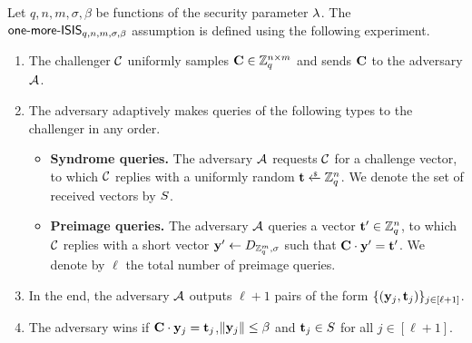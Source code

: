 \begin{definition}
    \label{def:omsis}
    Let $q,n,m,\sigma,\beta$ be functions of the security parameter $\lambda$.
    The $\mathsf{one}\text{-}\mathsf{more}\text{-}\mathsf{ISIS}_{q,n,m,\sigma,\beta}$ assumption is defined using the following
    experiment.
    \begin{enumerate}
        \item The challenger $\mathcal{C}$ uniformly samples $\mathbf{C}\in\mathbb{Z}_q^{n\times m}$ and sends $\mathbf{C}$ to the adversary $\mathcal{A}$.
        \item The adversary adaptively makes queries of the following types to the
        challenger in any order.
        \begin{itemize}
            \item \textbf{Syndrome queries.} The adversary $\mathcal{A}$ requests $\mathcal{C}$ for a challenge vector, to which $\mathcal{C}$ replies with
            a uniformly random $\vect\getsr\Zq^n$. We denote the set of received vectors by $S$.
            \item \textbf{Preimage queries.} The adversary $\mathcal{A}$ queries a vector $\mathbf{t}'\in\mathbb{Z}_q^n$, to which $\mathcal{C}$ replies with a short vector
            $\mathbf{y}'\gets D_{\mathbb{Z}_q^m,\sigma}$ such that $\mathbf{C}\cdot\mathbf{y}'=\mathbf{t}'$.
            We denote by $\ell$ the total number of preimage queries.
        \end{itemize}
        \item In the end, the adversary $\mathcal{A}$ outputs $\ell+1$ pairs of the form
        $\{(\mathbf{y}_j,\mathbf{t}_j)\}_{j\in[\ell+1]}$.
        \item The adversary wins if $\mathbf{C}\cdot\mathbf{y}_j=\mathbf{t}_j$,$\lVert\mathbf{y}_j\rVert\leq\beta$ and $\mathbf{t}_j\in S$ for all $j\in[\ell+1]$.
    \end{enumerate}
\end{definition}